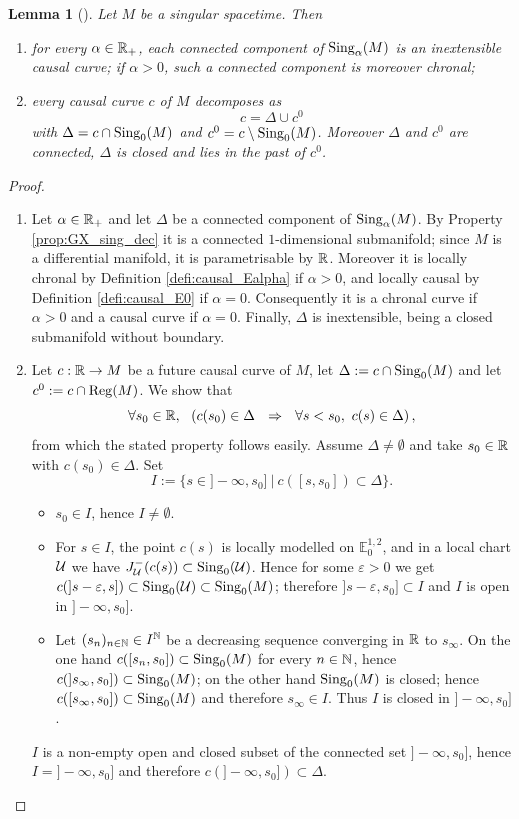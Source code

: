\documentclass[a4paper,twoside]{article}
\newcommand{\mass}[1]{\mathbb{E}^{1,2}_{#1}}
\newtheorem{lem}{Lemma}[section]
\begin{document}
\begin{lem}[{\cite[Lem.~1.9]{brunswic2021cauchy}}] \label{lem:past_BTZ}
Let $M$ be a singular spacetime. Then
\begin{enumerate}[label=(\alph*)]
\item for every $\alpha\in \mathbb R_+$, each connected component of $\mathrm{Sing}_\alpha(M)$ is an inextensible causal curve;
if $\alpha>0$, such a connected component is moreover chronal;
\item every causal curve $c$ of $M$ decomposes as
$$c=\Delta\cup c^0$$
with $\Delta=c\cap \mathrm{Sing}_0(M)$ and
$c^0=c\setminus \mathrm{Sing}_0(M)$.
Moreover $\Delta$ and $c^0$ are connected, $\Delta$ is closed and lies in the past of $c^0$.
\end{enumerate}
\end{lem}
\begin{proof}\
\begin{enumerate}[label=(\alph*)]
\item Let $\alpha \in \mathbb R_+$ and let $\Delta$ be a connected component of $\mathrm{Sing}_\alpha(M)$. By Property \ref{prop:GX_sing_dec}
it is a connected $1$-dimensional submanifold; since $M$ is a differential manifold, it is parametrisable by $\mathbb R$.
Moreover it is locally chronal by Definition \ref{defi:causal_Ealpha} if $\alpha>0$, and
locally causal by Definition \ref{defi:causal_E0} if $\alpha=0$. Consequently
it is a chronal curve if $\alpha>0$ and a causal curve if $\alpha=0$. Finally, $\Delta$ is inextensible, being a closed submanifold without boundary.
\item
Let $c:\mathbb R\rightarrow M$ be a future causal curve of $M$, let $\Delta:=c\cap \mathrm{Sing}_0(M)$ and let $c^0:= c\cap \mathrm{Reg}(M)$.
We show that
$$\forall s_0\in \mathbb R,~~\left(c(s_0)\in \Delta ~~\Rightarrow~~ \forall s<s_0,~ c(s)\in \Delta\right), $$
from which the stated property follows easily.
Assume $\Delta\neq \emptyset$ and take $s_0\in \mathbb R$ with $c(s_0) \in \Delta$. Set
$$I:=\{s\in ]-\infty,s_0]~|~ c([s,s_0])\subset \Delta\}. $$
\begin{itemize}
\item $s_0\in I$, hence $I\neq \emptyset$.
\item For $s\in I$, the point $c(s)$ is locally modelled on $\mass{0}$, and in a local chart $\mathcal{U}$ we have
$J^-_{\mathcal{U}}(c(s))\subset \mathrm{Sing}_0(\mathcal{U})$.
Hence for some $\varepsilon>0$ we get $c(]s-\varepsilon,s])\subset \mathrm{Sing}_0(\mathcal{U})\subset \mathrm{Sing}_0(M)$;
therefore $]s-\varepsilon,s_0]\subset I$ and $I$ is open in $]-\infty,s_0]$.
\item Let $(s_n)_{n\in \mathbb{N}}\in I^{\mathbb{N}}$ be a decreasing sequence converging in $\mathbb R$ to $s_\infty$.
On the one hand $c([s_n, s_0])\subset \mathrm{Sing}_0(M)$ for every $n\in \mathbb{N}$, hence $c(]s_\infty,s_0])\subset \mathrm{Sing}_0(M)$;
on the other hand $\mathrm{Sing}_0(M)$ is closed; hence $c([s_\infty,s_0]) \subset \mathrm{Sing}_0(M)$ and therefore $s_\infty\in I$.
Thus $I$ is closed in $]-\infty,s_0]$.
\end{itemize}
$I$ is a non-empty open and closed subset of the connected set $]-\infty, s_0]$, hence $I=]-\infty,s_0]$
and therefore $c(]-\infty,s_0])\subset \Delta$.
\end{enumerate}
\end{proof}
\end{document}
